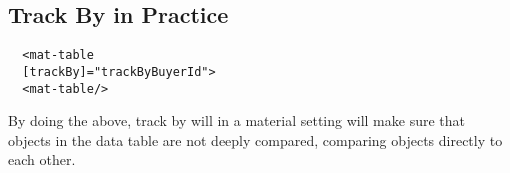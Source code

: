 \subsection{ Track By in Practice }
\begin{lstlisting}
  <mat-table
  [trackBy]="trackByBuyerId">
  <mat-table/>
\end{lstlisting}

By doing the above, track by will in a material setting will make sure that
objects in the data table are not deeply compared, comparing objects directly to
each other. 
